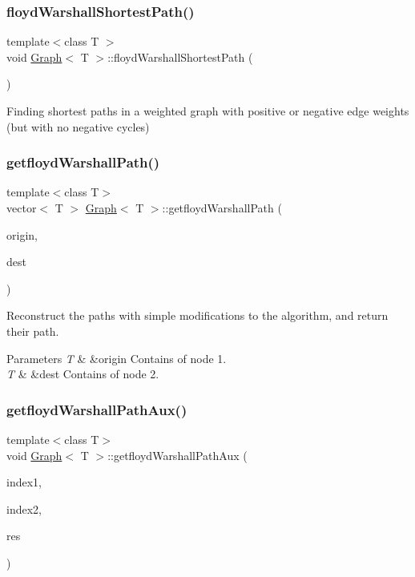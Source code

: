 \subsubsection{\texorpdfstring{floyd\+Warshall\+Shortest\+Path()}{floydWarshallShortestPath()}}
{\footnotesize\ttfamily template$<$class T $>$ \\
void \hyperlink{class_graph}{Graph}$<$ T $>$\+::floyd\+Warshall\+Shortest\+Path (\begin{DoxyParamCaption}{ }\end{DoxyParamCaption})}

Finding shortest paths in a weighted graph with positive or negative edge weights (but with no negative cycles) \hypertarget{class_graph_ab23d1dae92a7f2b29dcb91a94336674c}{}\label{class_graph_ab23d1dae92a7f2b29dcb91a94336674c} 
\subsubsection{\texorpdfstring{getfloyd\+Warshall\+Path()}{getfloydWarshallPath()}}
{\footnotesize\ttfamily template$<$class T$>$ \\
vector$<$ T $>$ \hyperlink{class_graph}{Graph}$<$ T $>$\+::getfloyd\+Warshall\+Path (\begin{DoxyParamCaption}\item[{const T \&}]{origin,  }\item[{const T \&}]{dest }\end{DoxyParamCaption})}

Reconstruct the paths with simple modifications to the algorithm, and return their path.


\begin{DoxyParams}{Parameters}
{\em T} & \&origin Contains of node 1. \\
\hline
{\em T} & \&dest Contains of node 2. \\
\hline
\end{DoxyParams}
\hypertarget{class_graph_aad1eda4beb8425d03ed1f3b8af397563}{}\label{class_graph_aad1eda4beb8425d03ed1f3b8af397563} 
\subsubsection{\texorpdfstring{getfloyd\+Warshall\+Path\+Aux()}{getfloydWarshallPathAux()}}
{\footnotesize\ttfamily template$<$class T$>$ \\
void \hyperlink{class_graph}{Graph}$<$ T $>$\+::getfloyd\+Warshall\+Path\+Aux (\begin{DoxyParamCaption}\item[{int}]{index1,  }\item[{int}]{index2,  }\item[{vector$<$ T $>$ \&}]{res }\end{DoxyParamCaption})}

